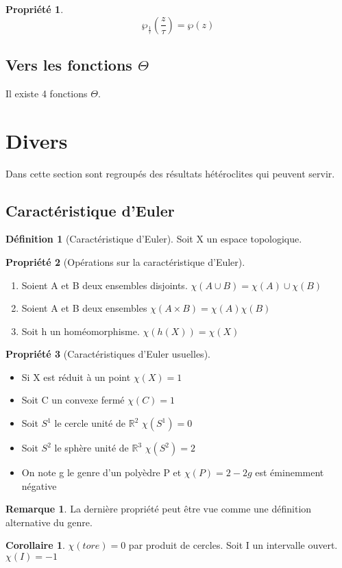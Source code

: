 \documentclass{article}
\newcommand{\R}{\mathbb{R}} %
\theoremstyle{definition} %
\newtheorem{defi}{Définition}
\newtheorem{rmq}{Remarque}
\newtheorem{propri}{Propriété}
\newtheorem{cor}{Corollaire}
\newcommand{\1}{\mathbb{1}} %
\begin{document}
\begin{propri}
$$\wp_{\frac{1}{\tau}} (\frac{z}{\tau}) = \wp (z)$$
\end{propri}


\subsection{Vers les fonctions $\Theta$}

Il existe 4 fonctions $\Theta$.


\section{Divers}
Dans cette section sont regroupés des résultats hétéroclites qui peuvent servir.

\subsection{Caractéristique d'Euler}


\begin{defi}[Caractéristique d'Euler]
Soit X un espace topologique.
\end{defi}

\begin{propri}[Opérations sur la caractéristique d'Euler]
\begin{enumerate}
\item Soient A et B deux ensembles disjoints.
$\chi(A \cup B)=\chi(A) \cup \chi(B)$
\item Soient A et B deux ensembles
$\chi(A \times B)=\chi(A) \chi(B)$
\item Soit h un homéomorphisme.
$\chi(h(X))=\chi(X)$
\end{enumerate}
\end{propri}


\begin{propri}[Caractéristiques d'Euler usuelles]

\begin{itemize}
\item Si X est réduit à un point
$\chi(X)=1$
\item Soit C un convexe fermé 
$\chi(C)=1$
\item Soit $S^1$ le cercle unité de $\R^2$
$\chi(S^1)=0$
\item Soit $S^2$ le sphère unité de $\R^3$
$\chi(S^2)=2$
\item On note g le genre d'un polyèdre P et
$\chi(P)=2-2g$ est éminemment négative
\end{itemize}

\begin{rmq}
La dernière propriété peut être vue comme une définition alternative du genre.
\end{rmq}

\begin{cor}
$\chi(tore)=0$ par produit de cercles.
Soit I un intervalle ouvert.
$\chi(I)=-1$
\end{cor}

\end{propri}
\end{document}
